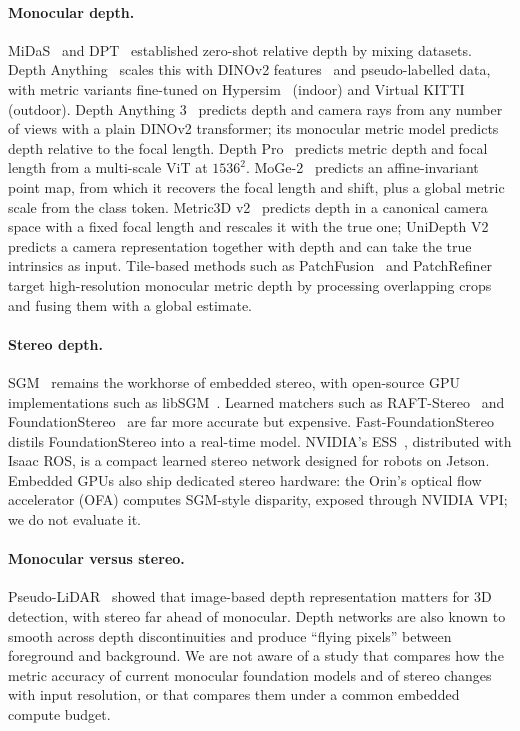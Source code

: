 \documentclass[10pt,twocolumn]{article}
\begin{document}
\paragraph{Monocular depth.}
MiDaS~\cite{ranftl2022midas} and DPT~\cite{ranftl2021dpt} established zero-shot relative depth by
mixing datasets. Depth Anything~\cite{yang2024depth,yang2024depthv2} scales this with DINOv2
features~\cite{oquab2024dinov2} and pseudo-labelled data, with metric variants fine-tuned on
Hypersim~\cite{roberts2021hypersim} (indoor) and Virtual KITTI (outdoor). Depth Anything
3~\cite{lin2026da3} predicts depth and camera rays from any number of views with a plain DINOv2
transformer; its monocular metric model predicts depth relative to the focal length. Depth
Pro~\cite{bochkovskii2025depthpro} predicts metric depth and focal length from a multi-scale ViT at
$1536^2$. MoGe-2~\cite{wang2025moge2} predicts an affine-invariant point map, from which it recovers the
focal length and shift, plus a global metric scale from the class token. Metric3D
v2~\cite{hu2024metric3dv2} predicts depth in a canonical camera space with a fixed focal length and
rescales it with the true one; UniDepth V2~\cite{piccinelli2025unidepthv2} predicts a camera
representation together with depth and can take the true intrinsics as input. Tile-based methods such as
PatchFusion~\cite{li2024patchfusion} and PatchRefiner~\cite{li2024patchrefiner} target high-resolution
monocular metric depth by processing overlapping crops and fusing them with a global estimate.

\paragraph{Stereo depth.}
SGM~\cite{hirschmuller2008sgm} remains the workhorse of embedded stereo, with open-source GPU
implementations such as libSGM~\cite{fixstars2024libsgm}. Learned matchers such as
RAFT-Stereo~\cite{lipson2021raft} and FoundationStereo~\cite{wen2025foundationstereo} are far more
accurate but expensive. Fast-FoundationStereo~\cite{wen2025fastfoundationstereo} distils
FoundationStereo into a real-time model. NVIDIA's ESS~\cite{nvidia2024ess}, distributed with Isaac ROS,
is a compact learned stereo network designed for robots on Jetson. Embedded GPUs also ship dedicated
stereo hardware: the Orin's optical flow accelerator (OFA) computes SGM-style disparity, exposed
through NVIDIA VPI; we do not evaluate it.

\paragraph{Monocular versus stereo.}
Pseudo-LiDAR~\cite{wang2019pseudolidar} showed that image-based depth representation matters for
3D detection, with stereo far ahead of monocular. Depth networks are also known to smooth across
depth discontinuities and produce ``flying pixels'' between foreground and background. We are not aware
of a study that compares how the metric accuracy of current monocular foundation models and of stereo
changes with input resolution, or that compares them under a common embedded compute budget.
\end{document}
